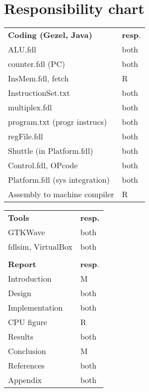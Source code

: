 \section*{Responsibility chart}
\renewcommand{\arraystretch}{1}
\begin{multicols}{2}

\begin{table}[H]
    \begin{tabular}{ll}
    \textbf{Coding (Gezel, Java)}                & \textbf{resp}. \\
    ALU.fdl                             & both  \\
    counter.fdl (PC)                    & both  \\
    InsMem.fdl, fetch                   & R     \\
    InstructionSet.txt                  & both  \\
    multiplex.fdl                       & both  \\
    program.txt (progr instrucs)        & both  \\
    regFile.fdl                         & both  \\
    Shuttle (in Platform.fdl)           & both  \\
    Control.fdl, OPcode                 & both  \\
    Platform.fdl (sys integration)      & both  \\
    Assembly to machine compiler        & R     \\
    \end{tabular}
\end{table}

\begin{table}[H]
    \begin{tabular}{ll}
    \textbf{Tools}              & \textbf{resp.} \\
    GTKWave                     & both  \\
    fdlsim, VirtualBox          & both  \\
                                &       \\
    \textbf{Report}                         & \textbf{resp}. \\
    Introduction                   & M     \\
    Design                         & both  \\
    Implementation                 & both  \\
    CPU figure                     & R     \\
    Results                        & both  \\
    Conclusion                     & M     \\
    References                     & both  \\
    Appendix                       & both  \\
    \end{tabular}
\end{table}

\end{multicols}
\renewcommand{\arraystretch}{1}